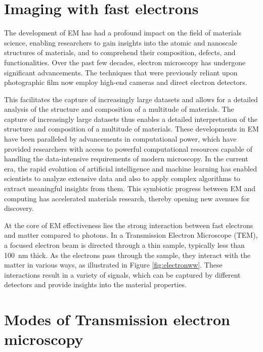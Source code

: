 \section{Imaging with fast electrons}

The development of EM has had a profound impact on the field of materials science, enabling researchers to gain insights into the atomic and nanoscale structures of materials, and to comprehend their composition, defects, and functionalities.
Over the past few decades, electron microscopy has undergone significant advancements.
The techniques that were previously reliant upon photographic film now employ high-end cameras and direct electron detectors.
\par This facilitates the capture of increasingly large datasets and allows for a detailed analysis of the structure and composition of a multitude of materials.
The capture of increasingly large datasets thus enables a detailed interpretation of the structure and composition of a multitude of materials.
These developments in EM have been paralleled by advancements in computational power, which have provided researchers with access to powerful computational resources capable of handling the data-intensive requirements of modern microscopy.
In the current era, the rapid evolution of artificial intelligence and machine learning has enabled scientists to analyze extensive data and also to apply complex algorithms to extract meaningful insights from them.
This symbiotic progress between EM and computing has accelerated materials research, thereby opening new avenues for discovery.

\par At the core of EM effectiveness lies the strong interaction between fast electrons and matter compared to photons.
In a Transmission Electron Microscope (TEM), a focused electron beam is directed through a thin sample, typically less than \SI{100}{\nano\metre} thick.
As the electrons pass through the sample, they interact with the matter in various ways, as illustrated in Figure \ref{fig:electronww}.
These interactions result in a variety of signals, which can be captured by different detectors and provide insights into the material properties.




\section{Modes of Transmission electron microscopy}

